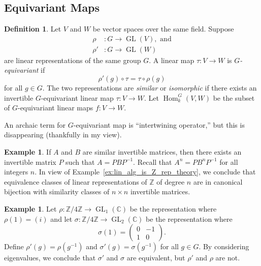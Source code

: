 \documentclass[12pt]{article}
\theoremstyle{plain}
\theoremstyle{definition}
\newtheorem{definition}[theorem]{Definition}
\newtheorem{example}[theorem]{Example}
\theoremstyle{remark}
\numberwithin{equation}{section}
\begin{document}
\subsection{Equivariant Maps}

\begin{definition}
Let $V$ and $W$ be vector spaces over the same field.
Suppose
\begin{align*}
\rho &: G \to \operatorname{GL}(V), \textrm{ and}\\
\rho' &: G \to \operatorname{GL}(W)
\end{align*}
are linear representations of the same group $G$.
A linear map $\tau : V \to W$ is \emph{$G$-equivariant} if
\[
\rho'(g) \circ \tau = \tau \circ \rho(g)
\]
for all $g \in G$.
The two representations are \emph{similar} or \emph{isomorphic} if there
exists an invertible $G$-equivariant linear map $\tau : V \to W$.
Let $\operatorname{Hom}_k^G(V,W)$ be the subset of
$G$-equivariant linear maps $f : V \to W$.
\end{definition}

An archaic term for $G$-equivariant map is ``intertwining operator,''
but this is disappearing (thankfully in my view).

\begin{example}
If $A$ and $B$ are similar invertible matrices, then there exists
an invertible matrix $P$ such that $A=PBP^{-1}$.
Recall that $A^n=PB^nP^{-1}$ for all integers $n$.
In view of Example~\ref{ex:lin_alg_is_Z_rep_theory}, we conclude that
equivalence classes of linear representations of
$\mathbb{Z}$ of degree $n$ are in canonical bijection with
similarity classes of $n \times n$ invertible matrices.
\end{example}

\begin{example}
Let $\rho : \mathbb{Z}/4\mathbb{Z} \to
\operatorname{GL}_1(\mathbb{C})$
be the representation where $\rho(1)=(i)$
and let $\sigma : \mathbb{Z}/4\mathbb{Z} \to
\operatorname{GL}_2(\mathbb{C})$
be the representation where
\[
\sigma(1) = \begin{pmatrix} 0&-1\\1&0 \end{pmatrix} .
\]
Define $\rho'(g)=\rho(g^{-1})$
and $\sigma'(g)=\sigma(g^{-1})$ for all $g \in G$.
By considering eigenvalues, we conclude that
$\sigma'$ and $\sigma$ are equivalent, but $\rho'$ and $\rho$ are not.
\end{example}
\end{document}
